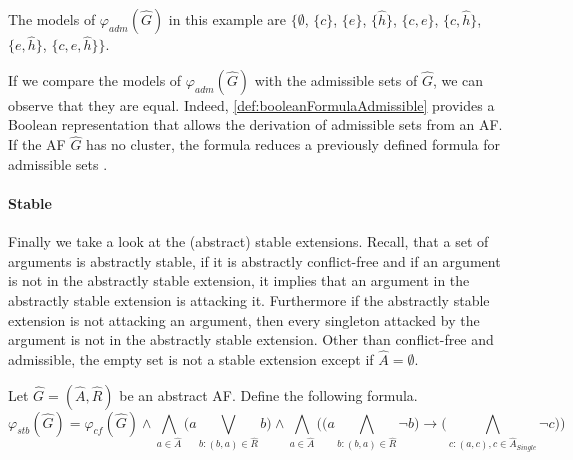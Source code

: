 \begin{example}
The models of $\varphi_{adm}(\hat{G})$ in this example are $\big\{\emptyset$, $\{c\}$, $\{e\}$, $\{\hat{h}\}$, $\{c, e\}$, $\{c, \hat{h}\}$, $\{e, \hat{h}\}$, $\{c, e, \hat{h}\} \big\}$.
\end{example}

If we compare the models of $ \varphi_{adm}(\hat{G})$ with the admissible sets of $\hat{G}$, we can observe that they are equal. Indeed, \cref{def:booleanFormulaAdmissible} provides a Boolean representation that allows the derivation of admissible sets from an AF. If the AF $\hat{G}$ has no cluster, the formula reduces a previously defined formula for admissible sets \cite{inproceedingsBesnardDoutreBooleanFormulaSemantics}.



\paragraph{Stable} Finally we take a look at the (abstract) stable extensions. Recall, that a set of arguments is abstractly stable, if it is abstractly conflict-free and if an
argument is not in the abstractly stable extension, it implies that an argument in the
abstractly stable extension is attacking it. Furthermore if the abstractly stable extension
is not attacking an argument, then every singleton attacked by the argument is not in the
abstractly stable extension. Other than conflict-free and admissible, the empty set is not a stable extension except if $\hat{A} = \emptyset$.
\begin{definition}
    Let $\hat{G}=(\hat{A},\hat{R})$ be an abstract AF. Define the following formula.
        \[ \varphi_{stb}(\hat{G}) =
        \varphi_{cf}(\hat{G}) \land \bigwedge_{a \in \hat{A}} \big( a \bigvee_{b:(b,a)\in \hat{R}} b\big) \land \bigwedge_{a \in \hat{A}} \big( \big(  a \bigwedge_{b:(b,a) \in \hat{R}} \lnot b\big)  \rightarrow \big( \bigwedge_{c:(a,c), c \in \hat{A}_{\mathit{Single}}} \lnot c\big) \big)
        \]
    \label{def:booleanFormulaStable}
\end{definition}


